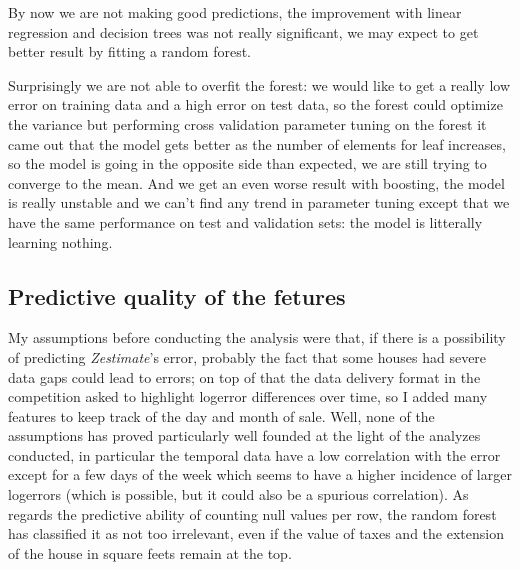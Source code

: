 By now we are not making good predictions, the improvement with linear regression and decision trees was not really significant, we may expect to get better result by fitting a random forest. 

Surprisingly we are not able to overfit the forest: we would like to get a really low error on training data and a high error on test data, so the forest could optimize the variance but performing cross validation parameter tuning on the forest it came out that the model gets better as the number of elements for leaf increases, so the model is going in the opposite side than expected, we are still trying to converge to the mean. And we get an even worse result with boosting, the model is really unstable and we can't find any trend in parameter tuning except that we have the same performance on test and validation sets: the model is litterally learning nothing.



\subsection{Predictive quality of the fetures}\label{crafted_features}

My assumptions before conducting the analysis were that, if there is a possibility of predicting \textit{Zestimate}'s error, probably the fact that some houses had severe data gaps could lead to errors; on top of that the data delivery format in the competition asked to highlight logerror differences over time, so I added many features to keep track of the day and month of sale. Well, none of the assumptions has proved particularly well founded at the light of the analyzes conducted, in particular the temporal data have a low correlation with the error except for a few days of the week which seems to have a higher incidence of larger logerrors (which is possible, but it could also be a spurious correlation). As regards the predictive ability of counting null values per row, the random forest has classified it as not too irrelevant, even if the value of taxes and the extension of the house in square feets remain at the top.